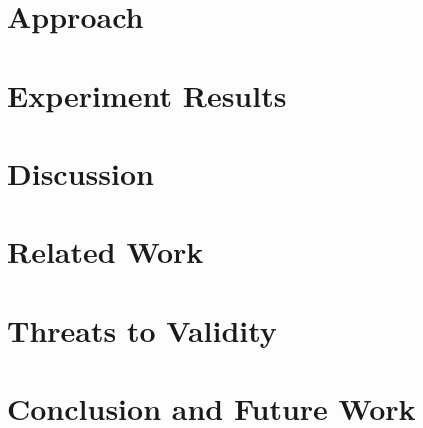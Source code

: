 \documentclass[10pt,journal,compsoc]{IEEEtran}
\begin{document}
\section{Approach}
\label{sec:approach}


\section{Experiment Results}
\label{sec:case_study_results}


\section{Discussion}
\label{sec:discussion}


\section{Related Work}
\label{sec:related_work}


\section{Threats to Validity}
\label{sec:threats_to_validity}


\section{Conclusion and Future Work}
\label{sec:conclusion}




%




\ifCLASSOPTIONcaptionsoff
  \newpage
\fi



 
\end{document}
